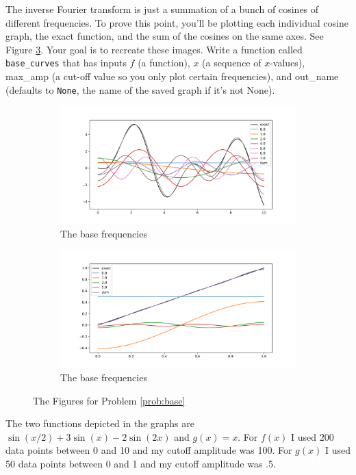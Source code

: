 \documentclass[11pt,letterpaper]{article}
\begin{document}
\begin{problem}
\label{prob:base}
The inverse Fourier transform is just a summation of a bunch of cosines of different frequencies. 
To prove this point, you'll be plotting each individual cosine graph, the exact function, and
the sum of the cosines on the same axes. See Figure \ref{fig:base}. Your goal is to recreate 
these images. Write a function called \texttt{base\_curves} that has inputs $f$ (a function),
$x$ (a sequence of $x$-values), max\_amp (a cut-off value so you only plot certain frequencies),
and out\_name (defaults to \texttt{None}, the name of the saved graph if it's not None).

\begin{figure}[!ht]
\centering
\begin{subfigure}{.48\textwidth}
\centering
 \includegraphics[width=\textwidth]{images/cos1.pdf}
 \caption{The base frequencies}
 \label{fig:cos1}
\end{subfigure}
\quad
\begin{subfigure}{.48\textwidth}
\centering
 \includegraphics[width=\textwidth]{images/cos2.pdf}
 \caption{The base frequencies}
 \label{fig:cos2}
\end{subfigure}
\caption{The Figures for Problem \ref{prob:base}}
\label{fig:base}
\end{figure}


The two functions depicted in the graphs are $\sin(x/2) + 3\sin(x) - 2\sin(2x)$ and $g(x) = x$.
For $f(x)$ I used 200 data points between 0 and 10 and my cutoff amplitude was 100. For $g(x)$
I used 50 data points between 0 and 1 and my cutoff amplitude was .5.


\end{problem}
\end{document}
